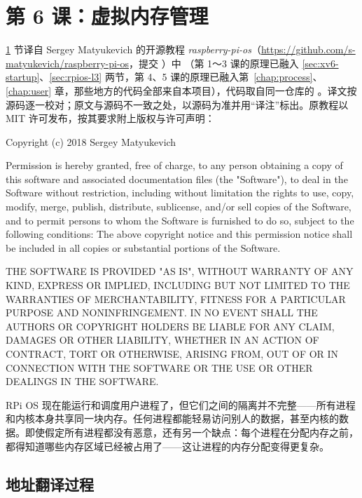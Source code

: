 \section{第 6 课：虚拟内存管理}
\label{sec:rpios-l6}

\begin{note}
  \ref{sec:rpios-l6} 节译自 Sergey Matyukevich 的开源教程 \emph{raspberry-pi-os}（\url{https://github.com/s-matyukevich/raspberry-pi-os}，提交 ）中 （第 1～3 课的原理已融入 \ref{sec:xv6-startup}、\ref{sec:rpios-l3} 两节，第 4、5 课的原理已融入第~\ref{chap:process}、\ref{chap:user} 章，那些地方的代码全部来自本项目），代码取自同一仓库的 。译文按源码逐一校对；原文与源码不一致之处，以源码为准并用“译注”标出。原教程以 MIT 许可发布，按其要求附上版权与许可声明：

  \smallskip
  {\footnotesize\ttfamily\raggedright
  Copyright (c) 2018 Sergey Matyukevich\par
  Permission is hereby granted, free of charge, to any person obtaining a copy of this software and associated documentation files (the "Software"), to deal in the Software without restriction, including without limitation the rights to use, copy, modify, merge, publish, distribute, sublicense, and/or sell copies of the Software, and to permit persons to whom the Software is furnished to do so, subject to the following conditions: The above copyright notice and this permission notice shall be included in all copies or substantial portions of the Software.\par
  THE SOFTWARE IS PROVIDED "AS IS", WITHOUT WARRANTY OF ANY KIND, EXPRESS OR IMPLIED, INCLUDING BUT NOT LIMITED TO THE WARRANTIES OF MERCHANTABILITY, FITNESS FOR A PARTICULAR PURPOSE AND NONINFRINGEMENT. IN NO EVENT SHALL THE AUTHORS OR COPYRIGHT HOLDERS BE LIABLE FOR ANY CLAIM, DAMAGES OR OTHER LIABILITY, WHETHER IN AN ACTION OF CONTRACT, TORT OR OTHERWISE, ARISING FROM, OUT OF OR IN CONNECTION WITH THE SOFTWARE OR THE USE OR OTHER DEALINGS IN THE SOFTWARE.\par}
\end{note}

RPi OS 现在能运行和调度用户进程了，但它们之间的隔离并不完整——所有进程和内核本身共享同一块内存。任何进程都能轻易访问别人的数据，甚至内核的数据。即使假定所有进程都没有恶意，还有另一个缺点：每个进程在分配内存之前，都得知道哪些内存区域已经被占用了——这让进程的内存分配变得更复杂。

\subsection{地址翻译过程}

